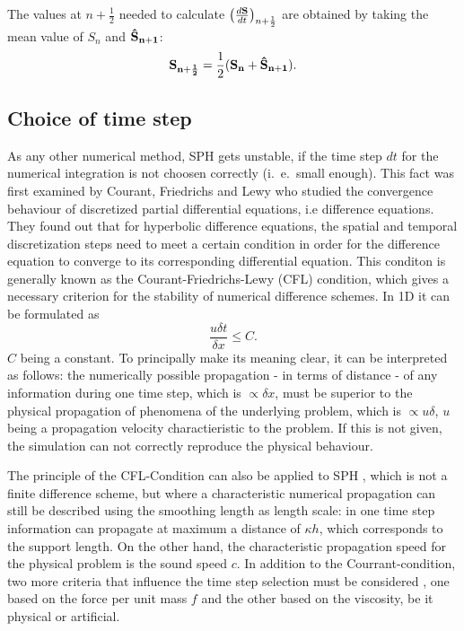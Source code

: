 \documentclass{report}
\begin{document}
The values at $n+\frac{1}{2}$ needed to calculate
$\left(\frac{d{\bf S}}{dt}\right)_{n+\frac{1}{2}}$ are obtained by taking the mean value of
$S_n$ and ${\bf \hat S_{n+1}}$:
\begin{equation}
{\bf S_{n+\frac{1}{2}}}=\frac{1}{2}({\bf S_n}+{\bf \hat S_{n+1}}).
\end{equation}

\subsection{Choice of time step}
\label{sec:TmeStepChoice}
As any other numerical method, SPH gets unstable, if the time step $dt$ for the numerical integration is not choosen correctly (i.\ e.\ small enough). 
This fact was first examined by Courant, Friedrichs and Lewy \cite{Courant1928} who studied the convergence behaviour of discretized partial differential equations, i.e difference equations. They found out that for hyperbolic difference equations, the spatial and temporal discretization steps need to meet a certain condition in order for the difference equation to converge to its  corresponding differential equation. This conditon is generally known as the Courant-Friedrichs-Lewy (CFL) condition, which gives a necessary criterion for the stability of numerical difference schemes.
In 1D it can be formulated as
\begin{equation}
 \frac{u\delta t}{\delta x}\leq C.
\end{equation}
$C$ being a constant.
To principally make its meaning clear, it can be interpreted as follows:
the numerically possible propagation - in terms of distance - of any information during one time step, which is $\propto\delta x$, must be superior to the physical propagation of phenomena of the underlying problem, which is $\propto u\delta$, $u$ being a propagation velocity charactieristic to the problem. If this is not given, the simulation can not correctly reproduce the physical behaviour. 

The principle of the CFL-Condition can also be applied to SPH \cite{Monaghan1989}, which is not a finite difference scheme, but where a characteristic numerical propagation can still be described using the smoothing length as length scale: in one time step information can propagate at maximum a distance of $\kappa h$, which corresponds to the support length. On the other hand, the characteristic propagation speed for the physical problem is the sound speed $c$. 
In addition to the Courrant-condition, two more criteria that influence the time step selection must be considered \cite{Monaghan1992}, one based on the force per unit mass $f$ and the other based on the viscosity, be it physical or artificial.
\end{document}
